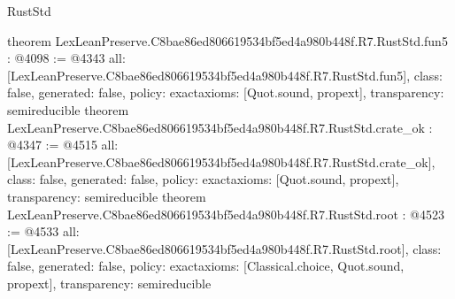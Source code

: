 \begin{lexlean}{RustStd}
\begin{coremodule}
{}
theorem LexLeanPreserve.C8bae86ed806619534bf5ed4a980b448f.R7.RustStd.fun5 : @4098 := @4343 {
  all: [LexLeanPreserve.C8bae86ed806619534bf5ed4a980b448f.R7.RustStd.fun5],
  class: false,
  generated: false,
  policy: exact{axioms: [Quot.sound, propext]},
  transparency: semireducible
}
theorem LexLeanPreserve.C8bae86ed806619534bf5ed4a980b448f.R7.RustStd.crate_ok : @4347 := @4515 {
  all: [LexLeanPreserve.C8bae86ed806619534bf5ed4a980b448f.R7.RustStd.crate_ok],
  class: false,
  generated: false,
  policy: exact{axioms: [Quot.sound, propext]},
  transparency: semireducible
}
theorem LexLeanPreserve.C8bae86ed806619534bf5ed4a980b448f.R7.RustStd.root : @4523 := @4533 {
  all: [LexLeanPreserve.C8bae86ed806619534bf5ed4a980b448f.R7.RustStd.root],
  class: false,
  generated: false,
  policy: exact{axioms: [Classical.choice, Quot.sound, propext]},
  transparency: semireducible
}


\end{coremodule}
\end{lexlean}
